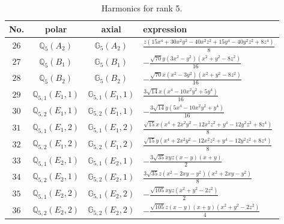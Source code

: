 \documentclass[fleqn,8pt,landscape]{jsarticle}
\begin{document}
\begin{table}[ht!]
\begin{center}
\caption{Harmonics for rank 5.}
\renewcommand{\arraystretch}{1.3}
\begin{tabular}{cccl} \hline \hline
No. & polar & axial & expression \\ \hline
$ 26 $ & $ \mathbb{Q}_{5}(A_{2}) $ & $ \mathbb{G}_{5}(A_{2}) $ & $ \frac{z \left(15 x^{4} + 30 x^{2} y^{2} - 40 x^{2} z^{2} + 15 y^{4} - 40 y^{2} z^{2} + 8 z^{4}\right)}{8} $ \\
$ 27 $ & $ \mathbb{Q}_{5}(B_{1}) $ & $ \mathbb{G}_{5}(B_{1}) $ & $ - \frac{\sqrt{70} y \left(3 x^{2} - y^{2}\right) \left(x^{2} + y^{2} - 8 z^{2}\right)}{16} $ \\
$ 28 $ & $ \mathbb{Q}_{5}(B_{2}) $ & $ \mathbb{G}_{5}(B_{2}) $ & $ - \frac{\sqrt{70} x \left(x^{2} - 3 y^{2}\right) \left(x^{2} + y^{2} - 8 z^{2}\right)}{16} $ \\
$ 29 $ & $ \mathbb{Q}_{5,1}(E_{1},1) $ & $ \mathbb{G}_{5,1}(E_{1},1) $ & $ \frac{3 \sqrt{14} x \left(x^{4} - 10 x^{2} y^{2} + 5 y^{4}\right)}{16} $ \\
$ 30 $ & $ \mathbb{Q}_{5,2}(E_{1},1) $ & $ \mathbb{G}_{5,2}(E_{1},1) $ & $ - \frac{3 \sqrt{14} y \left(5 x^{4} - 10 x^{2} y^{2} + y^{4}\right)}{16} $ \\
$ 31 $ & $ \mathbb{Q}_{5,1}(E_{1},2) $ & $ \mathbb{G}_{5,1}(E_{1},2) $ & $ \frac{\sqrt{15} x \left(x^{4} + 2 x^{2} y^{2} - 12 x^{2} z^{2} + y^{4} - 12 y^{2} z^{2} + 8 z^{4}\right)}{8} $ \\
$ 32 $ & $ \mathbb{Q}_{5,2}(E_{1},2) $ & $ \mathbb{G}_{5,2}(E_{1},2) $ & $ \frac{\sqrt{15} y \left(x^{4} + 2 x^{2} y^{2} - 12 x^{2} z^{2} + y^{4} - 12 y^{2} z^{2} + 8 z^{4}\right)}{8} $ \\
$ 33 $ & $ \mathbb{Q}_{5,1}(E_{2},1) $ & $ \mathbb{G}_{5,1}(E_{2},1) $ & $ - \frac{3 \sqrt{35} x y z \left(x - y\right) \left(x + y\right)}{2} $ \\
$ 34 $ & $ \mathbb{Q}_{5,2}(E_{2},1) $ & $ \mathbb{G}_{5,2}(E_{2},1) $ & $ \frac{3 \sqrt{35} z \left(x^{2} - 2 x y - y^{2}\right) \left(x^{2} + 2 x y - y^{2}\right)}{8} $ \\
$ 35 $ & $ \mathbb{Q}_{5,1}(E_{2},2) $ & $ \mathbb{G}_{5,1}(E_{2},2) $ & $ - \frac{\sqrt{105} x y z \left(x^{2} + y^{2} - 2 z^{2}\right)}{2} $ \\
$ 36 $ & $ \mathbb{Q}_{5,2}(E_{2},2) $ & $ \mathbb{G}_{5,2}(E_{2},2) $ & $ - \frac{\sqrt{105} z \left(x - y\right) \left(x + y\right) \left(x^{2} + y^{2} - 2 z^{2}\right)}{4} $ \\
 \hline \hline
\end{tabular}
\end{center}
\end{table}
\end{document}
